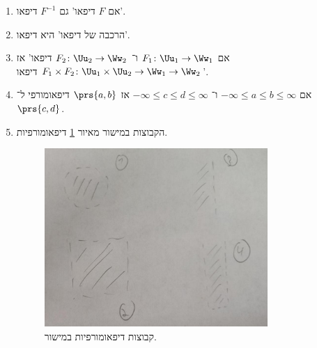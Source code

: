 \documentclass[a4paper,10pt,twoside,openany]{book}
\begin{document}
\begin{exercise}
\begin{enumerate}
\item אם
$F$
דיפאו' גם
$F^{-1}$
דיפאו'.
\item הרכבה של דיפאו' היא דיפאו'.
\item אם
$F_1 \colon \Uu_1 \to \Ww_1$
ו־%
$F_2 \colon \Uu_2 \to \Ww_2$
דיפאו' אז
$F_1 \times F_2 \colon \Uu_1 \times \Uu_2 \to \Ww_1 \to \Ww_2$
דיפאו'.
\item אם
$-\infty \leq a \leq b \leq \infty$
ו־%
$-\infty \leq c \leq d \leq \infty$
אז
$\prs{a,b}$
דיפאומורפי ל־%
$\prs{c,d}$.
\item הקבוצות במישור
מאיור
\ref{fig6}
דיפאומורפיות.
\begin{figure}[ht]
\centering
\caption{קבוצות דיפאומורפיות במישור.}
\label{fig6}
\includegraphics[width=0.8\textwidth]{sources/figure6}
\end{figure}
\end{enumerate}
\end{exercise}
\end{document}
